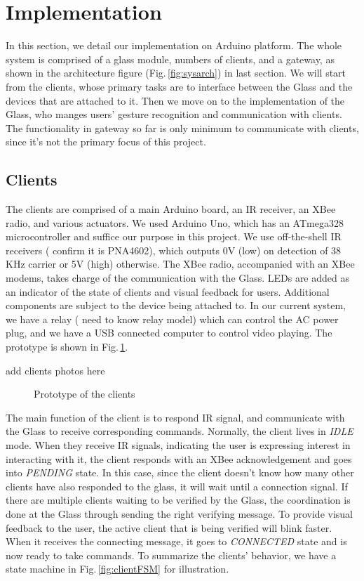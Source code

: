 \section{Implementation}
\label{sec:implementation}

In this section, we detail our implementation on Arduino \cite{Arduino} platform. The whole system is comprised of a glass module, numbers of clients, and a gateway, as shown in the architecture figure (Fig.\,\ref{fig:sysarch}) in last section. We will start from the clients, whose primary tasks are to interface between the Glass and the devices that are attached to it. Then we move on to the implementation of the Glass, who manges users' gesture recognition and communication with clients. The functionality in gateway so far is only minimum to communicate with clients, since it's not the primary focus of this project.

\subsection{Clients}
The clients are comprised of a main Arduino board, an IR receiver, an XBee radio, and various actuators. We used Arduino Uno, which has an ATmega328 microcontroller and suffice our purpose in this project. We use off-the-shell IR receivers ({\color{red} confirm it is PNA4602}), which outputs 0V (low) on detection of 38 KHz carrier or 5V (high) otherwise. The XBee radio, accompanied with an XBee modems, takes charge of the communication with the Glass. LEDs are added as an indicator of the state of clients and visual feedback for users. Additional components are subject to the device being attached to. In our current system, we have a relay ({\color{red} need to know relay model}) which can control the AC power plug, and we have a USB connected computer to control video playing. The prototype is shown in Fig.\,\ref{fig:client}.

{\color{red} add clients photos here}
\begin{figure}
  \centering
  \caption{Prototype of the clients}
  \label{fig:client}
\end{figure}

The main function of the client is to respond IR signal, and communicate with the Glass to receive corresponding commands. Normally, the client lives in {\it IDLE} mode. When they receive IR signals, indicating the user is expressing interest in interacting with it, the client responds with an XBee acknowledgement and goes into {\it PENDING} state. In this case, since the client doesn't know how many other clients have also responded to the glass, it will wait until a connection signal. If there are multiple clients waiting to be verified by the Glass, the coordination is done at the Glass through sending the right verifying message. To provide visual feedback to the user, the active client that is being verified will blink faster. When it receives the connecting message, it goes to {\it CONNECTED} state and is now ready to take commands. To summarize the clients' behavior, we have a state machine in Fig.\,\ref{fig:clientFSM} for illustration.

